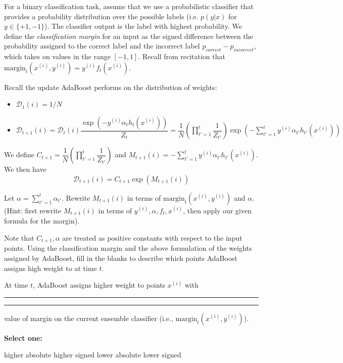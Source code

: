 \documentclass[11pt,addpoints,answers]{exam}
\newcommand{\sone}{\textbf{Select one: }}
\newcommand{\D}{\mathcal{D}}
\newcommand{\margin}{\text{margin}}
\begin{document}
\begin{questions}
\begin{parts}
For a binary classification task, assume that we use a probabilistic classifier that provides a probability distribution over the possible labels (i.e. $p(y|x)$ for $y \in \{+1,-1\}$). The classifier output is the label with highest probability.
We define the \textit{classification margin} for an input as the signed difference between the probability assigned to the correct label and the incorrect label $p_{correct} - p_{incorrect}$, which takes on values in the range $[-1, 1]$.
Recall from recitation that $\margin_t (x^{(i)}, y^{(i)}) = y^{(i)} f_t (x^{(i)})$.

\begin{subparts}
\subpart[2]  Recall the update AdaBoost performs on the distribution of weights:
\begin{itemize}
    \item $\D_1 (i) = 1 / N$
    \item $\D_{t+1} (i) = \D_t (i) \dfrac{\exp(-y^{(i)} \alpha_t h_t (x^{(i)}))}{Z_t} = \dfrac{1}{N} \left( \prod_{t'=1}^t \dfrac{1}{Z_{t'}} \right) \exp ( - \sum_{t'=1}^t y^{(i)} \alpha_{t'} h_{t'} (x^{(i)}) )$
\end{itemize}
We define $C_{t+1} = \dfrac{1}{N} \left( \prod_{t'=1}^t \dfrac{1}{Z_{t'}} \right)$ and $M_{t+1} (i) =  -\sum_{t'=1}^t y^{(i)} \alpha_{t'} h_{t'} (x^{(i)})$. 
We then have $$\D_{t+1} (i) = C_{t+1} \exp (M_{t+1} (i))$$

Let $\alpha = \sum_{t'=1}^t \alpha_{t'}$. Rewrite $M_{t+1} (i)$ in terms of $\margin_t (x^{(i)}, y^{(i)})$ and $\alpha$. (Hint: first rewrite $M_{t+1} (i)$ in terms of $y^{(i)}, \alpha, f_t, x^{(i)}$, then apply our given formula for the margin).

\begin{your_solution}[height=2.5cm, width=6cm]
\end{your_solution}

\clearpage

\subpart[1]  Note that $C_{t+1}, \alpha$ are treated as positive constants with respect to the input points. Using the classification margin and the above formulation of the weights assigned by AdaBoost, fill in the blanks to describe which points AdaBoost assigns high weight to at time $t$.

At time $t$, AdaBoost assigns higher weight to points $x^{(i)}$ with \rule{1cm}{0.15mm} \rule{1cm}{0.15mm} value of margin on the current ensemble classifier (i.e., $\margin_t (x^{(i)}, y^{(i)})$).

    \sone
    \begin{checkboxes}
    \choice higher absolute
    \choice higher signed
    \choice lower absolute
    \choice lower signed
    \end{checkboxes}


\end{subparts}
\end{parts}
\end{questions}
\end{document}
